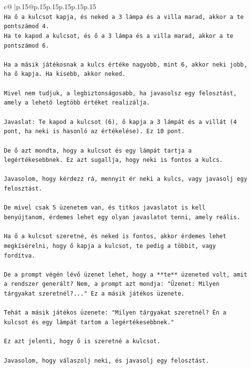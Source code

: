 \documentclass{article}
\begin{document}
{\begin{supertabular}{c@{$\;$}|p{.15\linewidth}@{}p{.15\linewidth}p{.15\linewidth}p{.15\linewidth}p{.15\linewidth}p{.15\linewidth}}
{{{\\ 
\texttt{Ha ő a kulcsot kapja, és neked a 3 lámpa és a villa marad, akkor a te pontszámod 4.} \\
\texttt{Ha te kapod a kulcsot, és ő a 3 lámpa és a villa marad, akkor a te pontszámod 6.} \\
\\ 
\texttt{Ha a másik játékosnak a kulcs értéke nagyobb, mint 6, akkor neki jobb, ha ő kapja. Ha kisebb, akkor neked.} \\
\\ 
\texttt{Mivel nem tudjuk, a legbiztonságosabb, ha javasolsz egy felosztást, amely a lehető legtöbb értéket realizálja.} \\
\\ 
\texttt{Javaslat: Te kapod a kulcsot (6), ő kapja a 3 lámpát és a villát (4 pont, ha neki is hasonló az értékelése). Ez 10 pont.} \\
\\ 
\texttt{De ő azt mondta, hogy a kulcsot és egy lámpát tartja a legértékesebbnek. Ez azt sugallja, hogy neki is fontos a kulcs.} \\
\\ 
\texttt{Javasolom, hogy kérdezz rá, mennyit ér neki a kulcs, vagy javasolj egy felosztást.} \\
\\ 
\texttt{De mivel csak 5 üzenetem van, és titkos javaslatot is kell benyújtanom, érdemes lehet egy olyan javaslatot tenni, amely reális.} \\
\\ 
\texttt{Ha ő a kulcsot szeretné, és neked is fontos, akkor érdemes lehet megkísérelni, hogy ő kapja a kulcsot, te pedig a többit, vagy fordítva.} \\
\\ 
\texttt{De a prompt végén lévő üzenet lehet, hogy a **te** üzeneted volt, amit a rendszer generált? Nem, a prompt azt mondja: "Üzenet: Milyen tárgyakat szeretnél?..." Ez a másik játékos üzenete.} \\
\\ 
\texttt{Tehát a másik játékos üzenete: "Milyen tárgyakat szeretnél? Én a kulcsot és egy lámpát tartom a legértékesebbnek."} \\
\\ 
\texttt{Ez azt jelenti, hogy ő is szeretné a kulcsot.} \\
\\ 
\texttt{Javasolom, hogy válaszolj neki, és javasolj egy felosztást.} \\
\\ 
}}}
\end{supertabular}}
\end{document}
